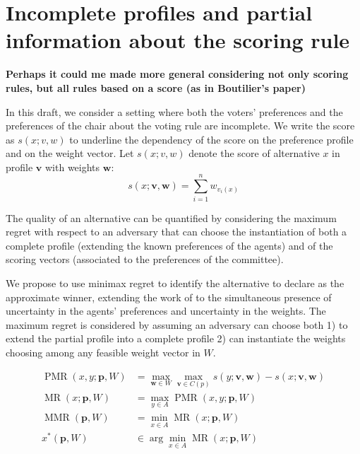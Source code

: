 \documentclass[12pt]{article}
\newcommand{\rank}{v}
\newcommand{\profile}{\textbf{v}}%
\newcommand{\pprofile}{\textbf{p}}%
\newcommand{\w}{\textbf{w}}%
\DeclareMathOperator{\PMR}{PMR}
\DeclareMathOperator{\MR}{MR}
\DeclareMathOperator{\MMR}{MMR}
\begin{document}
\section*{Incomplete profiles and partial information about the scoring rule}

{\bf Perhaps it could me made more general considering not only scoring rules, but all rules based on a score (as in Boutilier's paper)}

In this draft, we consider a setting where both the voters' preferences and the preferences of the chair about the voting rule are incomplete.
We write the score as $s(x; v,w)$ to underline the dependency of the score on the preference profile and on the weight vector. Let $s(x;v,w)$ denote the score of alternative $x$ in profile $\textbf{v}$ with weights $\textbf{w}$:
\[ s(x;\textbf{v},\textbf{w}) = \sum_{i=1}^{n} w_{\rank_i(x)} \]


The quality of an alternative can be quantified by considering the maximum regret with respect to an adversary that can choose the instantiation of both a complete profile (extending the known preferences of the agents) and of the scoring vectors (associated to the preferences of the committee).


We propose to use minimax regret to identify the alternative to declare as the approximate winner, extending the work of \cite{Lu2011} to the simultaneous presence of uncertainty in the agents' preferences and uncertainty in the weights.
The maximum regret is considered by assuming an adversary can choose both 1) to extend the partial profile into a complete profile 2) can instantiate the weights choosing among any feasible weight vector in $W$.


\begin{align*}
\PMR(x,y; \pprofile, W) &= \max_{\w \in W} \max_{\profile \in C(p)} s(y; \profile,\w) - s(x; \profile,\w)\\
\MR(x; \pprofile, W) &= \max_{y \in A} \PMR(x,y; \pprofile, W) \\
\MMR(\pprofile,W) & = \min_{x \in A} \MR(x;\pprofile,W) \\
x^{*}(\pprofile,W) & \in \arg\min_{x \in A} \MR(x;\pprofile,W) 
\end{align*}
\end{document}
